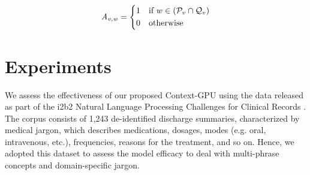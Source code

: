\documentclass[letterpaper]{article}
\begin{document}
\begin{equation}
  \mathit{A_{v,w}}=
  \begin{dcases}
      1 & \text{if  }  w \in (\mathcal{P}_{v} \cap \mathcal{Q}_{v})  \\
      0               & \text{otherwise}
  \end{dcases}
\label{eq:matrixA}
\end{equation}







\section{Experiments}

We assess the effectiveness of our proposed Context-GPU using the data released as part of the i2b2 Natural Language Processing Challenges for Clinical Records \cite{Uzuner10}. The corpus consists of 1,243 de-identified discharge summaries, characterized by medical jargon, which describes medications, dosages, modes (e.g. oral, intravenous, etc.), frequencies, reasons for the treatment, and so on. Hence, we adopted this dataset to assess the model efficacy to deal with multi-phrase concepts and domain-specific jargon.
\end{document}
